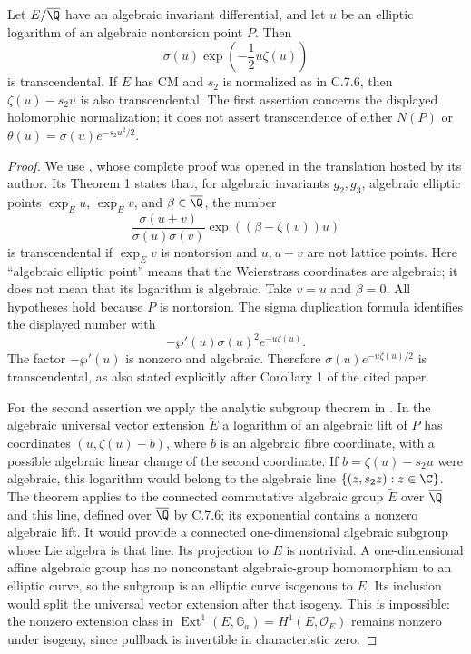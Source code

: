 \begin{proposition}\label{ari:C.7.7}
Let $E/\overline{\Q}$ have an algebraic invariant differential,
and let $u$ be an elliptic logarithm of an algebraic nontorsion
point $P$. Then
\[
 \sigma(u)\exp\left(-\frac12u\zeta(u)\right)
\]
is transcendental. If $E$ has CM and $s_2$ is normalized as in
C.7.6, then $\zeta(u)-s_2u$ is also transcendental. The first
assertion concerns the displayed holomorphic normalization;
it does not assert transcendence of either $N(P)$ or
$\theta(u)=\sigma(u)e^{-s_2u^2/2}$.
\end{proposition}
\begin{proof}
We use \citet[Theorem 1 and Corollary 1]{waldschmidt1979sigma},
whose complete proof was opened in the translation hosted by its
author. Its Theorem 1 states that, for algebraic invariants
$g_2,g_3$, algebraic elliptic points $\exp_Eu$, $\exp_Ev$, and
$\beta\in\overline{\Q}$, the number
\[
 \frac{\sigma(u+v)}{\sigma(u)\sigma(v)}
                      \exp((\beta-\zeta(v))u)
\]
is transcendental if $\exp_Ev$ is nontorsion and $u,u+v$
are not lattice points. Here ``algebraic elliptic point''
means that the Weierstrass coordinates are algebraic; it does
not mean that its logarithm is algebraic. Take $v=u$ and
$\beta=0$. All hypotheses hold because $P$ is nontorsion.
The sigma duplication formula identifies the displayed number
with
\[
 -\wp'(u)\sigma(u)^2e^{-u\zeta(u)}.
\]
The factor $-\wp'(u)$ is nonzero and algebraic. Therefore
$\sigma(u)e^{-u\zeta(u)/2}$ is transcendental, as also stated
explicitly after Corollary 1 of the cited paper.

For the second assertion we apply the analytic subgroup theorem
in \citet[Theorem 6.1]{huber2022}. In the algebraic universal
vector extension $\widetilde E$ a logarithm of an algebraic lift
of $P$ has coordinates $(u,\zeta(u)-b)$, where $b$ is an algebraic
fibre coordinate, with a possible algebraic linear change of the
second coordinate. If $b=\zeta(u)-s_2u$ were algebraic, this
logarithm would belong to the algebraic line
$\{(z,s_2z):z\in\C\}$. The theorem applies to the connected
commutative algebraic group $\widetilde E$ over
$\overline{\Q}$ and this line, defined over $\overline{\Q}$ by
C.7.6; its exponential contains a nonzero algebraic lift.
It would provide a connected one-dimensional algebraic subgroup
whose Lie algebra is that line. Its projection to $E$ is
nontrivial. A one-dimensional affine algebraic group has no
nonconstant algebraic-group homomorphism to an elliptic curve,
so the subgroup is an elliptic curve isogenous to $E$.
Its inclusion would split the universal vector extension after
that isogeny. This is impossible: the nonzero extension class in
$\operatorname{Ext}^1(E,\mathbb G_a)=H^1(E,\mathcal O_E)$
remains nonzero under isogeny, since pullback is invertible in
characteristic zero.
\end{proof}

